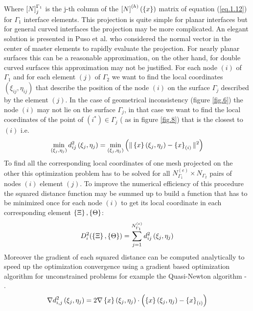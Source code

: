      Where $\left[{N}\right]_{j}^{\Gamma_1}$ is the j-th column of the $\left[{N}\right]^{(h)}(\left\lbrace{x}\right \rbrace)$ matrix of equation (\ref{eq.1.12}) for ${\Gamma_1}$ interface elements. This projection is quite simple for planar interfaces but for general curved interfaces the projection may be more complicated. An elegant solution is presented in Puso et al. \cite{puso20043d} who considered the normal vector in the center of master elements to rapidly evaluate the projection. For nearly planar surfaces this can be a reasonable approximation, on the other hand, for double curved surfaces this approximation may not be justified.
     For each node $(i)$ of $\Gamma_1$ and for each element $(j)$ of $\Gamma_2$ we want to find the local coordinates $(\xi_{ij},\eta_{ij})$ that describe the position of the node $(i)$ on the surface $\Gamma_j$ described by the element $(j)$. In the case of geometrical inconsistency (figure \ref{fig.6}) the node $(i)$ may not lie on the surface $\Gamma_j$, in that case we want to find the local coordinates of the point of $(i^*) \in \Gamma_j$ ( as in figure \ref{fig.8}) that is the closest to $(i)$ i.e.
     \begin{equation}
     \label{eq.43}
     \min_{\left(\xi_{j},\eta_{j}\right)}d^2_{ij}\left(\xi_{j},\eta_{j}\right)=\min_{\left(\xi_{j},\eta_{j}\right)}\left( \|\left\lbrace{x}\right \rbrace\left(\xi_{j},\eta_{j}\right)-\left\lbrace{x}\right \rbrace_{(i)} \|^2\right)
     \end{equation}
     To find all the corresponding local coordinates of one mesh projected on the other this optimization problem has to be solved for all $N^{(e)}_{\Gamma_1}\times N_{\Gamma_2}$ pairs of nodes $(i)$ element $(j)$. To improve the numerical efficiency of this procedure the squared distance function may be summed up to build a function that has to be minimized once for each node $(i)$ to get its local coordinate in each corresponding element $\left\lbrace{\Xi}\right \rbrace,\left\lbrace{\Theta}\right \rbrace$:
     \begin{equation}
     \label{eq.44}
     D_{i}^2(\left\lbrace{\Xi}\right \rbrace,\left\lbrace{\Theta}\right \rbrace)=\sum_{j=1}^{N^{(e)}_{\Gamma_1}}d^2_{ij}\left(\xi_{j},\eta_{j}\right)
     \end{equation}
     Moreover the gradient of each squared distance can be computed analytically to speed up the optimization convergence using a gradient based optimization algorithm for unconstrained problems for example the Quasi-Newton algorithm \cite{dennis1977quasi,davidon1959aec}- \cite{fletcher1963rapidly,dennis1996numerical}.
     \begin{equation}
     \label{eq.45}
     \nabla d_{i,j}^2 \left(\xi_{j},\eta_{j}\right)=2\nabla\left\lbrace{x}\right \rbrace\left(\xi_{j},\eta_{j}\right)\cdot\left( \left\lbrace{x}\right \rbrace\left(\xi_{j},\eta_{j}\right)-\left\lbrace{x}\right \rbrace_{(i)}\right)
     \end{equation}
